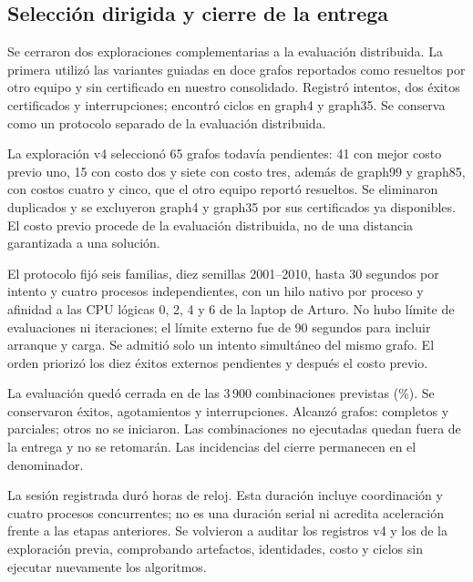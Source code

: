 \label{sec:exploration}
\subsection{Selección dirigida y cierre de la entrega}
Se cerraron dos exploraciones complementarias a la evaluación distribuida. La primera utilizó las variantes guiadas en doce grafos reportados como resueltos por otro equipo y sin certificado en nuestro consolidado. Registró \PriorAttempts{} intentos, dos éxitos certificados y \PriorErrors{} interrupciones; encontró ciclos en graph4 y graph35. Se conserva como un protocolo separado de la evaluación distribuida.

La exploración v4 seleccionó 65 grafos todavía pendientes: 41 con mejor costo previo uno, 15 con costo dos y siete con costo tres, además de graph99 y graph85, con costos cuatro y cinco, que el otro equipo reportó resueltos. Se eliminaron duplicados y se excluyeron graph4 y graph35 por sus certificados ya disponibles. El costo previo procede de la evaluación distribuida, no de una distancia garantizada a una solución.

El protocolo fijó seis familias, diez semillas 2001--2010, hasta 30 segundos por intento y cuatro procesos independientes, con un hilo nativo por proceso y afinidad a las CPU lógicas 0, 2, 4 y 6 de la laptop de Arturo. No hubo límite de evaluaciones ni iteraciones; el límite externo fue de 90 segundos para incluir arranque y carga. Se admitió solo un intento simultáneo del mismo grafo. El orden priorizó los diez éxitos externos pendientes y después el costo previo.

La evaluación quedó cerrada en \RepairAttempts{} de las 3\,900 combinaciones previstas (\RepairCoverage\%). Se conservaron \RepairSuccesses{} éxitos, \RepairExhausted{} agotamientos y \RepairErrors{} interrupciones. Alcanzó \RepairStarted{} grafos: \RepairComplete{} completos y \RepairPartial{} parciales; otros \RepairUnstarted{} no se iniciaron. Las \RepairOmitted{} combinaciones no ejecutadas quedan fuera de la entrega y no se retomarán. Las incidencias del cierre permanecen en el denominador.

La sesión registrada duró \RepairSessionHours{} horas de reloj. Esta duración incluye coordinación y cuatro procesos concurrentes; no es una duración serial ni acredita aceleración frente a las etapas anteriores. Se volvieron a auditar los \RepairAttempts{} registros v4 y los \PriorAttempts{} de la exploración previa, comprobando artefactos, identidades, costo y ciclos sin ejecutar nuevamente los algoritmos.

